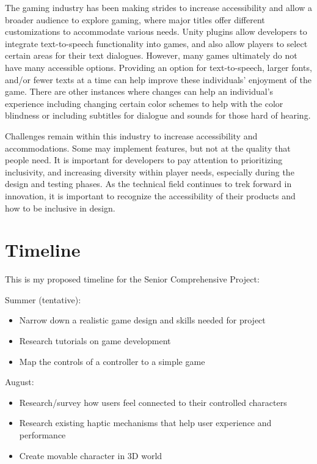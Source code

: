 \documentclass[10pt,twocolumn]{article}
\begin{document}
The gaming industry has been making strides to increase accessibility and allow a broader audience to explore gaming, where major titles offer different customizations to accommodate various needs. Unity plugins allow developers to integrate text-to-speech functionality into games, and also allow players to select certain areas for their text dialogues. However, many games ultimately do not have many accessible options. Providing an option for text-to-speech, larger fonts, and/or fewer texts at a time can help improve these individuals' enjoyment of the game. There are other instances where changes can help an individual's experience including changing certain color schemes to help with the color blindness or including subtitles for dialogue and sounds for those hard of hearing.\cite{Hassan_2024} 

Challenges remain within this industry to increase accessibility and accommodations. Some may implement features, but not at the quality that people need. It is important for developers to pay attention to prioritizing inclusivity, and increasing diversity within player needs, especially during the design and testing phases. As the technical field continues to trek forward in innovation, it is important to recognize the accessibility of their products and how to be inclusive in design.

\section{Timeline}
This is my proposed timeline for the Senior Comprehensive Project:

Summer (tentative):
\begin{itemize}
\item Narrow down a realistic game design and skills needed for project
\item Research tutorials on game development
\item Map the controls of a controller to a simple game
\end{itemize}

August:
\begin{itemize}
\item Research/survey how users feel connected to their controlled characters
\item Research existing haptic mechanisms that help user experience and performance
\item Create movable character in 3D world
\end{itemize}
\end{document}
